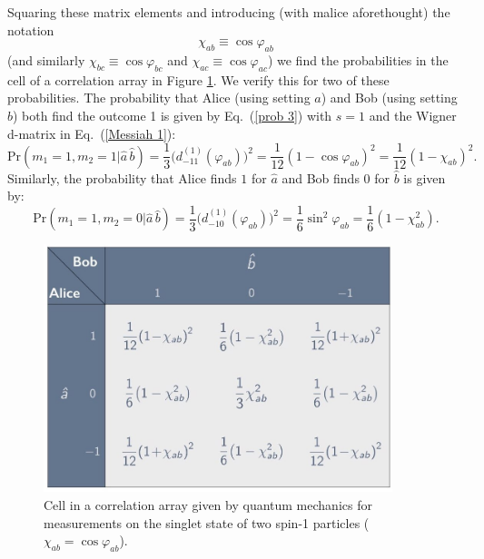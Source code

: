 Squaring these matrix elements and introducing (with malice aforethought) the notation
\begin{equation}
\chi_{ab} \equiv \cos\varphi_{ab}\label{spin-s cosines}
\end{equation}
(and similarly $\chi_{bc}\equiv \cos\varphi_{bc}$ and $\chi_{ac}\equiv \cos\varphi_{ac}$) we find the probabilities in the cell of a correlation array in Figure \ref{CA-cell-spin1-chi}. 
We verify this for two of these probabilities. The probability that Alice (using setting $\hat{a}$) and Bob  (using setting $\hat{b}$) both find the outcome 1 is given by Eq.\ (\ref{prob 3}) with $s=1$ and the Wigner d-matrix in Eq.\ (\ref{Messiah 1}):
\begin{equation}
\mathrm{Pr}(m_1 = 1, m_2 = 1| \hat{a}\, \hat{b} ) = \frac13 \Big( d^{(1)}_{-11}( \varphi_{ab}) \Big)^{\!2} 
= \frac{1}{12} (1-\cos{\varphi_{ab}})^2 = \frac{1}{12} (1-\chi_{ab})^2.
\label{prob 3aa}
\end{equation}
Similarly, the probability that Alice finds $1$ for $\hat{a}$ and Bob finds $0$ for $\hat{b}$ is given by:
\begin{equation}
\mathrm{Pr}(m_1 = 1, m_2 = 0| \hat{a}\, \hat{b} ) = \frac13 \Big( d^{(1)}_{-10}( \varphi_{ab}) \Big)^{\!2} = \frac16 \sin^{2}{\!\varphi_{ab}} = \frac16 (1-\chi_{ab}^2).
\label{prob 3a}
\end{equation}

\begin{figure}[h]
 \centering
   \includegraphics[width=4in]{CA-cell-spin1-chi.jpeg} 
   \caption{Cell in a correlation array given by quantum mechanics for measurements on the singlet state of two spin-1 particles ($\chi_{ab} = \cos{\varphi_{ab}}$).}
    \label{CA-cell-spin1-chi}
\end{figure}

